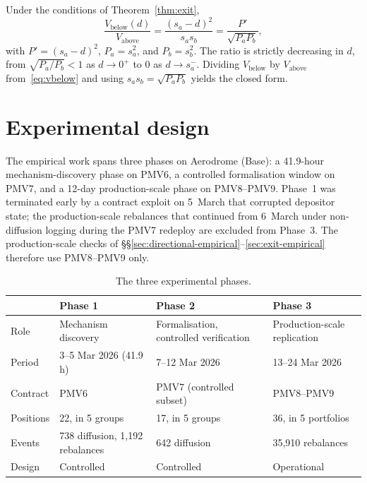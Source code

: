 \documentclass{manuscript}
\begin{document}
\begin{corollary}\label{cor:exit-ratio}
Under the conditions of Theorem~\ref{thm:exit},
\[
\frac{V_{\text{below}}(d)}{V_{\text{above}}}
=
\frac{(s_a - d)^2}{s_a s_b}
=
\frac{P'}{\sqrt{P_a P_b}},
\]
with $P' = (s_a - d)^2$, $P_a = s_a^2$, and $P_b = s_b^2$. The ratio is strictly decreasing in $d$, from $\sqrt{P_a/P_b} < 1$ as $d \to 0^+$ to $0$ as $d \to s_a^-$. Dividing $V_{\text{below}}$ by $V_{\text{above}}$ from~\eqref{eq:vbelow} and using $s_a s_b = \sqrt{P_a P_b}$ yields the closed form.
\end{corollary}

\section{Experimental design}\label{sec:experimental}

The empirical work spans three phases on Aerodrome (Base): a 41.9-hour mechanism-discovery phase on PMV6, a controlled formalisation window on PMV7, and a 12-day production-scale phase on PMV8--PMV9. Phase~1 was terminated early by a contract exploit on 5~March that corrupted depositor state; the production-scale rebalances that continued from 6~March under non-diffusion logging during the PMV7 redeploy are excluded from Phase~3. The production-scale checks of \S\S\ref{sec:directional-empirical}--\ref{sec:exit-empirical} therefore use PMV8--PMV9 only.

\begin{table}[H]
\centering
\caption{The three experimental phases.}
\label{tab:phases-overview}
\begin{tabular}{@{}lL{3.5cm}L{3.5cm}L{3.5cm}@{}}
\toprule
 & Phase 1 & Phase 2 & Phase 3 \\
\midrule
Role      & Mechanism discovery & Formalisation, controlled verification & Production-scale replication \\
Period    & 3--5 Mar 2026 (41.9 h) & 7--12 Mar 2026 & 13--24 Mar 2026 \\
Contract  & PMV6 & PMV7 (controlled subset) & PMV8--PMV9 \\
Positions & 22, in 5 groups & 17, in 5 groups & 36, in 5 portfolios \\
Events    & 738 diffusion, 1{,}192 rebalances & 642 diffusion & 35{,}910 rebalances \\
Design    & Controlled & Controlled & Operational \\
\bottomrule
\end{tabular}
\end{table}
\end{document}
